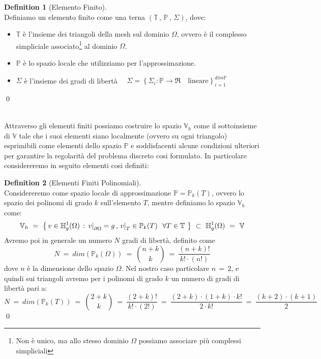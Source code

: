 \documentclass[12pt,a4paper]{report}
\theoremstyle{theorem}
\theoremstyle{definition}
\newtheorem{definition}{Definition}[section]
\newcommand\restr[2]{{%
  \left.\kern-\nulldelimiterspace %
  #1 %
  \right|_{#2} %
  }}
\begin{document}
\begin{definition}[Elemento Finito]  \label{Elemento Finito}
\hfill \\
Definiamo un elemento finito come una terna $( \mathbb{T} \, , \, \mathbb{P} \, , \, \Sigma )$, dove:
\begin{itemize}
	\item $\mathbb{T}$ è l'insieme dei triangoli della mesh sul dominio $\Omega$, ovvero è il complesso simpliciale associato\footnote{Non è unico, ma allo stesso dominio $\Omega$ possiamo associare più complessi simpliciali} al dominio $\Omega$.
	\item $\mathbb{P}$ è lo spazio locale che utilizziamo per l'approssimazione.
	\item $\Sigma$ è l'insieme dei gradi di libertà $\quad \Sigma = \left \{ \Sigma_{i} : \mathbb{P} \rightarrow \Re \quad \text{lineare} \right \}_{i=1}^{dim \mathbb{P}} $
\end{itemize}
\qed
\end{definition}
\hfill \\
Attraverso gli elementi finiti possiamo costruire lo spazio $\mathbb{V}_{h}$ come il sottoinsieme di $\mathbb{V}$ tale che i suoi elementi siano localmente (ovvero su ogni triangolo) esprimibili come elementi dello spazio $\mathbb{P}$ e soddisfacenti alcune condizioni ulteriori per garantire la regolarità del problema discreto cosi formulato. In particolare considereremo in seguito elementi cosi definiti:
\begin{definition}[Elementi Finiti Polinomiali]  \label{Elementi Finiti Polinomiali}
\hfill \\
Considereremo come spazio locale di approssimazione $\mathbb{P} = \mathbb{P}_{k}(T)$, ovvero lo spazio dei polinomi di grado $k$ sull'elemento $T$, mentre definiamo lo spazio $\mathbb{V}_{h}$ come:
\[ \mathbb{V}_{h} \ = \ \left \{ \, v \in \mathbb{H}_{g}^{1}(\Omega) \, :  \, \restr{v}{\partial \Omega} = g \, , \, \restr{v}{T} \in  \mathbb{P}_{k}(T) \ \ \forall T \in \mathbb{T} \ \right \} \ \subset \  \mathbb{H}_{g}^{1}(\Omega) \ = \ \mathbb{V} \]
Avremo poi in generale un numero $N$ gradi di libertà, definito come
\[ N \ = \ dim \left( \mathbb{P}_{k}(\Omega) \right) \ = \ \binom{n+k}{k} \ = \ \frac{(n+k)!}{k! \cdot (n!)} \]
dove $n$ è la dimensione dello spazio $\Omega$. Nel nostro caso particolare $n \, = \, 2$, e quindi sui triangoli avremo per i polinomi di grado $k$ un numero di gradi di libertà pari a:
\[ N \ = \ dim \left( \mathbb{P}_{k}(T) \right) \ = \ \binom{2+k}{k} \ = \ \frac{(2+k)!}{k! \cdot (2!)} \ = \ \frac{(2+k) \cdot (1+k) \cdot k!}{2 \cdot k!} \ = \ \frac{(k+2) \cdot (k+1)}{2} \]
\qed
\end{definition}
\end{document}
